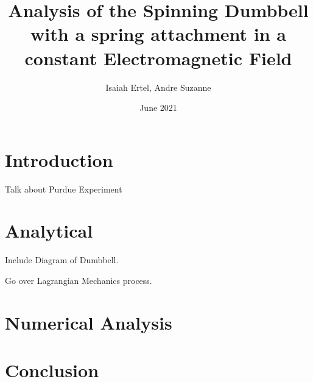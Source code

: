 \documentclass{article}
\title{Analysis of the Spinning Dumbbell with a spring attachment in a constant Electromagnetic Field}
\author{Isaiah Ertel, Andre Suzanne}
\date{June 2021}
\begin{document}
\maketitle

\section{Introduction}
Talk about Purdue Experiment

\section{Analytical}

Include Diagram of Dumbbell.

Go over Lagrangian Mechanics process.

\section{Numerical Analysis}

\section{Conclusion}
\end{document}
